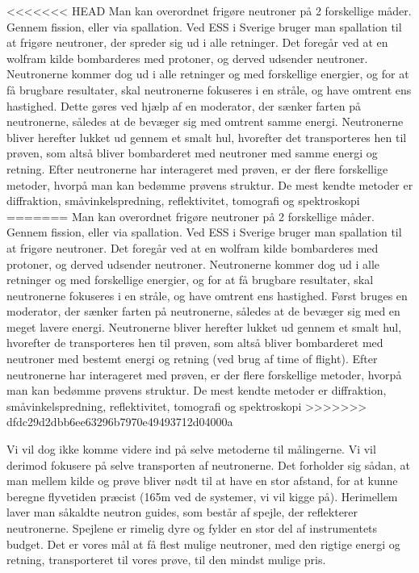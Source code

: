 \documentclass[12pt,oneside,a4paper]{article}
\begin{document}
{{{{{<<<<<<< HEAD
Man kan overordnet frigøre neutroner på 2 forskellige måder. Gennem fission, eller via spallation. Ved ESS i Sverige bruger man spallation til at frigøre neutroner, der spreder sig ud i alle retninger. Det foregår ved at en wolfram kilde bombarderes med protoner, og derved udsender neutroner. Neutronerne kommer dog ud i alle retninger og med forskellige energier, og for at få brugbare resultater, skal neutronerne fokuseres i en stråle, og have omtrent ens hastighed. Dette gøres ved hjælp af en moderator, der sænker farten på neutronerne, således at de bevæger sig med omtrent samme energi. Neutronerne bliver herefter lukket ud gennem et smalt hul, hvorefter det transporteres hen til prøven, som altså bliver bombarderet med neutroner med samme energi og retning. Efter neutronerne har interageret med prøven, er der flere forskellige metoder, hvorpå man kan bedømme prøvens struktur. De mest kendte metoder er diffraktion, småvinkelspredning, reflektivitet, tomografi og spektroskopi \cite{ess_folder}
=======
Man kan overordnet frigøre neutroner på 2 forskellige måder. Gennem fission, eller via spallation. Ved ESS i Sverige bruger man spallation til at frigøre neutroner. Det foregår ved at en wolfram kilde bombarderes med protoner, og derved udsender neutroner. Neutronerne kommer dog ud i alle retninger og med forskellige energier, og for at få brugbare resultater, skal neutronerne fokuseres i en stråle, og have omtrent ens hastighed. Først bruges en moderator, der sænker farten på neutronerne, således at de bevæger sig med en meget lavere energi. Neutronerne bliver herefter lukket ud gennem et smalt hul, hvorefter de transporteres hen til prøven, som altså bliver bombarderet med neutroner med bestemt energi og retning (ved brug af time of flight). Efter neutronerne har interageret med prøven, er der flere forskellige metoder, hvorpå man kan bedømme prøvens struktur. De mest kendte metoder er diffraktion, småvinkelspredning, reflektivitet, tomografi og spektroskopi \cite{ess_folder}
>>>>>>> dfdc29d2dbb6ee63296b7970e49493712d04000a

Vi vil dog ikke komme videre ind på selve metoderne til målingerne. Vi vil derimod fokusere på selve transporten af neutronerne. Det forholder sig sådan, at man mellem kilde og prøve bliver nødt til at have en stor afstand, for at kunne beregne flyvetiden præcist (165m ved de systemer, vi vil kigge på). Herimellem laver man såkaldte neutron guides, som består af spejle, der reflekterer neutronerne. Spejlene er rimelig dyre og fylder en stor del af instrumentets budget. Det er vores mål at få flest mulige neutroner, med den rigtige energi og retning, transporteret til vores prøve, til den mindst mulige pris.


}}}}}
\end{document}
